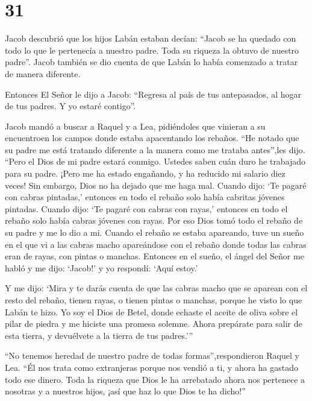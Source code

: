 \hypertarget{section-30}{%
\section{31}\label{section-30}}

 Jacob descubrió que los hijos Labán estaban decían: ``Jacob
se ha quedado con todo lo que le pertenecía a nuestro padre. Toda su
riqueza la obtuvo de nuestro padre''.  Jacob también se dio
cuenta de que Labán lo había comenzado a tratar de manera diferente.

 Entonces El Señor le dijo a Jacob: ``Regresa al país de tus
antepasados, al hogar de tus padres. Y yo estaré contigo''.

 Jacob mandó a buscar a Raquel y a Lea, pidiéndoles que
vinieran a su encuentroen los campos donde estaba apacentando los
rebaños.  ``He notado que su padre me está tratando
diferente a la manera como me trataba antes'',les dijo. ``Pero el Dios
de mi padre estará conmigo.  Ustedes saben cuán duro he
trabajado para su padre.  ¡Pero me ha estado engañando, y ha
reducido mi salario diez veces! Sin embargo, Dios no ha dejado que me
haga mal.  Cuando dijo: `Te pagaré con cabras pintadas,'
entonces en todo el rebaño solo había cabritas jóvenes pintadas. Cuando
dijo: `Te pagaré con cabras con rayas,' entonces en todo el rebaño solo
había cabras jóvenes con rayas.  Por eso Dios tomó todo el
rebaño de su padre y me lo dio a mi.  Cuando el rebaño se
estaba apareando, tuve un sueño en el que vi a las cabras macho
apareándose con el rebaño donde todas las cabras eran de rayas, con
pintas o manchas.  Entonces en el sueño, el ángel del Señor
me habló y me dijo: `Jacob!' y yo respondí: `Aquí estoy.'

 Y me dijo: `Mira y te darás cuenta de que las cabras macho
que se aparean con el resto del rebaño, tienen rayas, o tienen pintas o
manchas, porque he visto lo que Labán te hizo.  Yo soy el
Dios de Betel, donde echaste el aceite de oliva sobre el pilar de piedra
y me hiciste una promesa solemne. Ahora prepárate para salir de esta
tierra, y devuélvete a la tierra de tus padres.'''

 ``No tenemos heredad de nuestro padre de todas
formas'',respondieron Raquel y Lea.  ``Él nos trata como
extranjeras porque nos vendió a ti, y ahora ha gastado todo ese dinero.
 Toda la riqueza que Dios le ha arrebatado ahora nos
pertenece a nosotras y a nuestros hijos, ¡así que haz lo que Dios te ha
dicho!''

